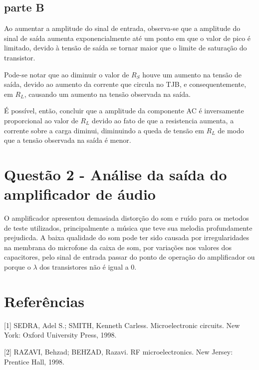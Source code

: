 \documentclass{abntex2}
\begin{document}
\subsection{parte B}

Ao aumentar a amplitude do sinal de entrada, observa-se que a amplitude do sinal de saída aumenta exponencialmente até um ponto em que o valor de pico é limitado, devido à tensão de saída se tornar maior que o limite de saturação do transistor.

Pode-se notar que ao diminuir o valor de $R_S$ houve um aumento na tensão de saída, devido ao aumento da corrente que circula no TJB, e consequentemente, em $R_L$, causando um aumento na tensão observada na saída.

É possível, então, concluir que a amplitude da componente AC é inversamente proporcional ao valor de $R_L$ devido ao fato de que a resistencia aumenta, a corrente sobre a carga diminui, diminuindo a queda de tensão em $R_L$ de modo que a tensão observada na saída é menor.

\section{Questão 2 - Análise da saída do amplificador de áudio}

O amplificador apresentou demasiada distorção do som e ruído para os metodos de teste utilizados, principalmente a música que teve sua melodia profundamente prejudicda. A baixa qualidade do som pode ter sido causada por irregularidades na membrana do microfone da caixa de som, por variações nos valores dos capacitores, pelo sinal de entrada passar do ponto de operação do amplificador ou porque o $\lambda$ dos transistores não é igual a 0.

\clearpage

\section*{Referências}

[1] SEDRA, Adel S.; SMITH, Kenneth Carless. Microelectronic circuits. New York: Oxford University Press, 1998.

[2] RAZAVI, Behzad; BEHZAD, Razavi. RF microelectronics. New Jersey: Prentice Hall, 1998.
\end{document}
